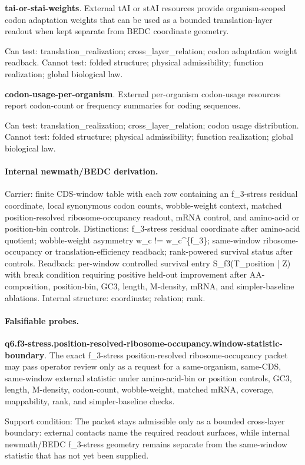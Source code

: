 \textbf{tai-or-stai-weights}. External tAI or stAI resources provide organism-scoped codon adaptation weights that can be used as a bounded translation-layer readout when kept separate from BEDC coordinate geometry.

Can test: translation\_realization; cross\_layer\_relation; codon adaptation weight readback. Cannot test: folded structure; physical admissibility; function realization; global biological law.

\textbf{codon-usage-per-organism}. External per-organism codon-usage resources report codon-count or frequency summaries for coding sequences.

Can test: translation\_realization; cross\_layer\_relation; codon usage distribution. Cannot test: folded structure; physical admissibility; function realization; global biological law.

\paragraph{Internal newmath/BEDC derivation.} Carrier: finite CDS-window table with each row containing an f\_3-stress residual coordinate, local synonymous codon counts, wobble-weight context, matched position-resolved ribosome-occupancy readout, mRNA control, and amino-acid or position-bin controls. Distinctions: f\_3-stress residual coordinate after amino-acid quotient; wobble-weight asymmetry w\_c != w\_c\textasciicircum{}\{f\_3\}; same-window ribosome-occupancy or translation-efficiency readback; rank-powered survival status after controls. Readback: per-window controlled survival entry S\_f3(T\_position | Z) with break condition requiring positive held-out improvement after AA-composition, position-bin, GC3, length, M-density, mRNA, and simpler-baseline ablations. Internal structure: coordinate; relation; rank.

\paragraph{Falsifiable probes.}
\textbf{q6.f3-stress.position-resolved-ribosome-occupancy.window-statistic-boundary}. The exact f\_3-stress position-resolved ribosome-occupancy packet may pass operator review only as a request for a same-organism, same-CDS, same-window external statistic under amino-acid-bin or position controls, GC3, length, M-density, codon-count, wobble-weight, matched mRNA, coverage, mappability, rank, and simpler-baseline checks.

Support condition: The packet stays admissible only as a bounded cross-layer boundary: external contacts name the required readout surfaces, while internal newmath/BEDC f\_3-stress geometry remains separate from the same-window statistic that has not yet been supplied.

